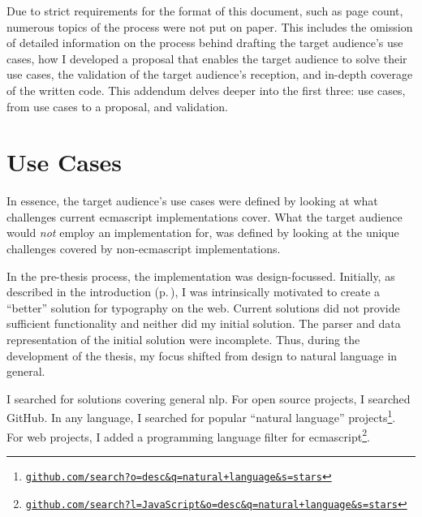 
\begingroup
\let\clearpage\relax
\let\cleardoublepage\relax
\let\cleardoublepage\relax

\manualmark
{}

\noindent Due to strict requirements for the format of this document,
  such as page count, numerous topics of the process were not put on paper.
This includes the omission of detailed information on the process behind
  drafting the target audience's use cases, how I developed a proposal that
  enables the target audience to solve their use cases, the validation of the
  target audience's reception, and in-depth coverage of the written code.
This addendum delves deeper into the first three: use cases, from use cases
  to a proposal, and validation.

\chapter*{Use Cases}\label{addendum-use-cases}

In essence, the target audience's use cases were defined by looking at what
  challenges current \gls{ecmascript} implementations cover.
What the target audience would \emph{not} employ an implementation for, was
  defined by looking at the unique challenges covered by non-\gls{ecmascript}
  implementations.

In the pre-thesis process, the implementation was design-focussed.
Initially, as described in the introduction (p.\,\pageref{introduction}), I
  was intrinsically motivated to create a ``better'' solution for typography
  on the web.
Current solutions did not provide sufficient functionality and neither did my
  initial solution.
The parser and data representation of the initial solution were incomplete.
Thus, during the development of the thesis, my focus shifted from design to
  natural language in general.

I searched for solutions covering general \gls{nlp}.
For open source projects, I searched GitHub.
In any language, I searched for popular ``natural language''
  projects\footnote{
    \href{https://github.com/search?o=desc&q=natural+language&s=stars}{\nolinkurl{github.com/search?o=desc&q=natural+language&s=stars}}
  }.
For web projects, I added a programming language filter for
  \gls{ecmascript}\footnote{
    \href{https://github.com/search?l=JavaScript&o=desc&q=natural+language&s=stars}{\nolinkurl{github.com/search?l=JavaScript&o=desc&q=natural+language&s=stars}}
  }.

